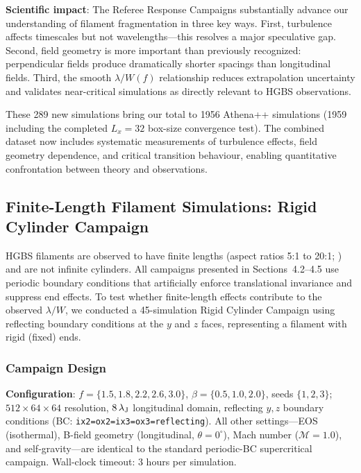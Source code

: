 \documentclass[twoside,twocolumn]{mnras}
\begin{document}
\textbf{Scientific impact}: The Referee Response Campaigns substantially advance our understanding of filament fragmentation in three key ways. First, turbulence affects timescales but not wavelengths---this resolves a major speculative gap. Second, field geometry is more important than previously recognized: perpendicular fields produce dramatically shorter spacings than longitudinal fields. Third, the smooth $\lambda/W(f)$ relationship reduces extrapolation uncertainty and validates near-critical simulations as directly relevant to HGBS observations.

These 289 new simulations bring our total to 1956 Athena++ simulations (1959 including the completed $L_x = 32$ box-size convergence test). The combined dataset now includes systematic measurements of turbulence effects, field geometry dependence, and critical transition behaviour, enabling quantitative confrontation between theory and observations.

\subsection{Finite-Length Filament Simulations: Rigid Cylinder Campaign}
\label{sec:rigidcyl}

HGBS filaments are observed to have finite lengths (aspect ratios 5:1 to 20:1; \citealt{Arzoumanian2019}) and are not infinite cylinders. All campaigns presented in Sections~4.2--4.5 use periodic boundary conditions that artificially enforce translational invariance and suppress end effects. To test whether finite-length effects contribute to the observed $\lambda/W$, we conducted a 45-simulation Rigid Cylinder Campaign using reflecting boundary conditions at the $y$ and $z$ faces, representing a filament with rigid (fixed) ends.

\subsubsection{Campaign Design}

\textbf{Configuration}: $f = \{1.5, 1.8, 2.2, 2.6, 3.0\}$, $\beta = \{0.5, 1.0, 2.0\}$, seeds $\{1, 2, 3\}$; $512 \times 64 \times 64$ resolution, $8\,\lambda_{\rm J}$ longitudinal domain, reflecting $y,z$ boundary conditions (BC: \texttt{ix2=ox2=ix3=ox3=reflecting}). All other settings---EOS (isothermal), B-field geometry (longitudinal, $\theta = 0^\circ$), Mach number ($\mathcal{M} = 1.0$), and self-gravity---are identical to the standard periodic-BC supercritical campaign. Wall-clock timeout: 3 hours per simulation.
\end{document}
